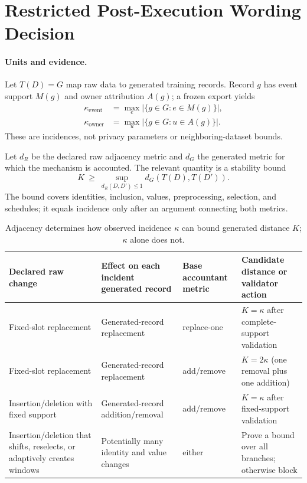 \documentclass[letterpaper]{article} %
\newcommand{\ke}{\kappa_{\mathrm{event}}}
\newcommand{\ko}{\kappa_{\mathrm{owner}}}
\begin{document}
\section{Restricted Post-Execution Wording Decision}

\paragraph{Units and evidence.}
Let $T(D)=G$ map raw data to generated training records. Record $g$ has event support $M(g)$ and owner attribution $A(g)$; a frozen export yields
\begin{align}
\ke &= \max_e |\{g\in G:e\in M(g)\}|,\\
\ko &= \max_u |\{g\in G:u\in A(g)\}|.
\end{align}
These are incidences, not privacy parameters or neighboring-dataset bounds.

Let $d_R$ be the declared raw adjacency metric and $d_G$ the generated metric for which the mechanism is accounted. The relevant quantity is a stability bound
\begin{equation}
K \ \geq\ \sup_{d_R(D,D')\leq 1} d_G(T(D),T(D')).
\label{eq:stability}
\end{equation}
The bound covers identities, inclusion, values, preprocessing, selection, and schedules; it equals incidence only after an argument connecting both metrics.

\begin{table}[t]
\centering
\begin{tabular}{p{}p{}p{}p{}}
\hline
Declared raw change & Effect on each incident generated record & Base accountant metric & Candidate distance or validator action \\
\hline
Fixed-slot replacement & Generated-record replacement & replace-one & $K=\kappa$ after complete-support validation \\
Fixed-slot replacement & Generated-record replacement & add/remove & $K=2\kappa$ (one removal plus one addition) \\
Insertion/deletion with fixed support & Generated-record addition/removal & add/remove & $K=\kappa$ after fixed-support validation \\
Insertion/deletion that shifts, reselects, or adaptively creates windows & Potentially many identity and value changes & either & Prove a bound over all branches; otherwise block \\
\hline
\end{tabular}
\caption{Adjacency determines how observed incidence $\kappa$ can bound generated distance $K$; $\kappa$ alone does not.}
\label{tab:adjacency}
\end{table}
\end{document}
